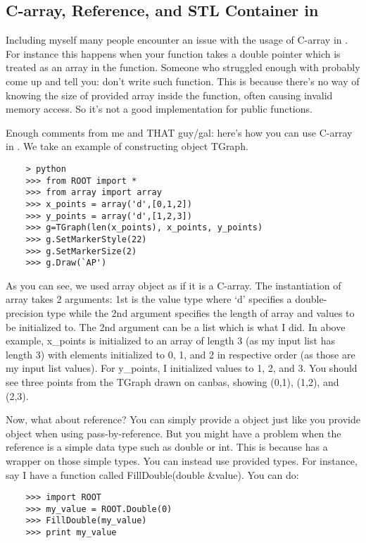 \subsection{{\ttfamily C}-array, Reference, and {\ttfamily STL} Container in \PyROOT}
Including myself many people encounter an issue with the usage of {\ttfamily C}-array in \PyROOT.
For instance this happens when your \CPP function takes a {\ttfamily double} pointer which is
treated as an array in the function. Someone who struggled enough with \CPP probably come up and tell you: 
don't write such function. This is because there's no way of knowing the size of provided array inside the 
function, often causing invalid memory access. So it's not a good implementation for public functions. 

Enough comments from me and THAT \CPP guy/gal: here's how you can use {\ttfamily C}-array in \python.
We take an example of constructing \ROOT object {\ttfamily TGraph}.
\begin{lstlisting}
    > python
    >>> from ROOT import *
    >>> from array import array
    >>> x_points = array('d',[0,1,2])
    >>> y_points = array('d',[1,2,3])
    >>> g=TGraph(len(x_points), x_points, y_points)
    >>> g.SetMarkerStyle(22)
    >>> g.SetMarkerSize(2)
    >>> g.Draw(`AP')
\end{lstlisting}
As you can see, we used {\ttfamily array} object as if it is a {\ttfamily C}-array.
The instantiation of {\ttfamily array} takes 2 arguments: 1st is the value type where `d' specifies
a double-precision type while the 2nd argument specifies the length of array and values to be initialized to.
The 2nd argument can be a list which is what I did. In above example, {\ttfamily x\_points} is initialized
to an array of length 3 (as my input list has length 3) with elements initialized to 0, 1, and 2 in respective
order (as those are my input list values). For {\ttfamily y\_points}, I initialized values to 1, 2, and 3.
You should see three points from the {\ttfamily TGraph} drawn on canbas, showing (0,1), (1,2), and (2,3).

Now, what about reference?
You can simply provide a \python object just like you provide \CPP object when using pass-by-reference.
But you might have a problem when the reference is a simple data type such as {\ttfamily double} or {\ttfamily int}.
This is because \ROOT has a wrapper on those simple types. You can instead use \ROOT provided types.
For instance, say I have a function called {\ttfamily FillDouble(double \&value)}. You can do:
\begin{lstlisting}
    >>> import ROOT
    >>> my_value = ROOT.Double(0)
    >>> FillDouble(my_value)
    >>> print my_value
\end{lstlisting}

